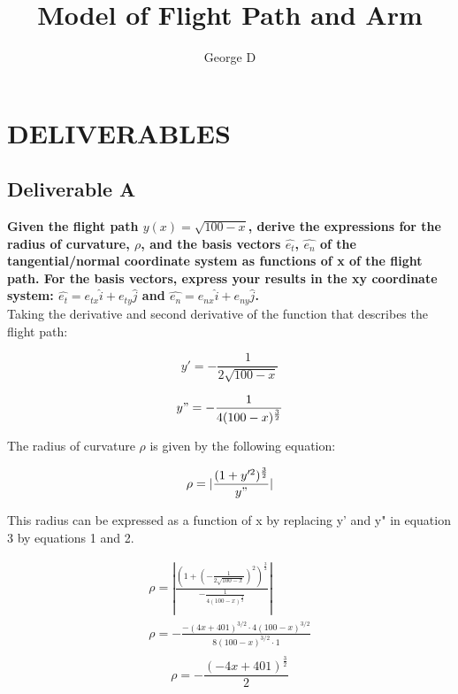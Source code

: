 \documentclass[12pt, a4paper]{article}
\begin{document}
\title{Model of Flight Path and Arm}
\author{George D}
\maketitle{}

\section{DELIVERABLES}

\subsection{Deliverable A}

\textbf{Given the flight path $y(x) = \sqrt{100-x}$, derive the expressions for the radius of curvature, $\rho$, and the basis vectors $\hat{e_t}$, $\hat{e_n}$ of the tangential/normal coordinate system as functions of x of the flight path. For the basis vectors, express your results in the xy coordinate system: $\hat{e_t} = e_{tx}\hat{i} + e_{ty}\hat{j}$ and $\hat{e_n} = e_{nx}\hat{i} + e_{ny}\hat{j}$.} \\

Taking the derivative and second derivative of the function that describes the flight path:

\begin{equation}
    y' = - \frac{1}{2\sqrt{100-x}}
\end{equation}

\begin{equation}
    y" = - \frac{1}{4(100-x)^\frac{3}{2}}
\end{equation}

The radius of curvature $\rho$ is given by the following equation: 

\begin{equation}
    \rho = |\frac{(1 + y'^2)^\frac{3}{2}}{y"}| \\ 
\end{equation}

This radius can be expressed as a function of x by replacing y' and y" in equation 3 by equations 1 and 2.

\begin{align*}
    \rho = |\frac{(1 + (- \frac{1}{2\sqrt{100-x}})^2)^\frac{3}{2}}{- \frac{1}{4(100-x)^\frac{3}{2}}}| \\ 
    \rho = - \frac{-(4x+401)^{3/2} \cdot 4(100-x)^{3/2}}{8(100-x)^{3/2} \cdot 1} \\ 
\end{align*}
\begin{equation}
    \rho = - \frac{(-4x+401)^{\frac{3}{2}}}{2}
\end{equation}
\end{document}
